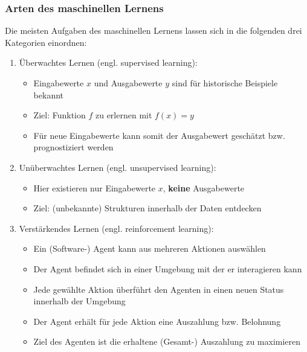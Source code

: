 \begin{frame}
\frametitle{Arten des maschinellen Lernens}
Die meisten Aufgaben des maschinellen Lernens lassen sich in die folgenden drei Kategorien einordnen:
\begin{enumerate}[<+->]
\item Überwachtes Lernen (engl. supervised learning):
	\begin{itemize}[<+->]
		\item Eingabewerte $x$ und Ausgabewerte $y$ sind für historische Beispiele bekannt
		\item Ziel: Funktion $f$ zu erlernen mit $f(x) = y$
		\item Für neue Eingabewerte kann somit der Ausgabewert geschätzt bzw. prognostiziert werden
	\end{itemize}
\item Unüberwachtes Lernen (engl. unsupervised learning):
	\begin{itemize}[<+->]
		\item Hier existieren nur Eingabewerte $x$, \textbf{keine} Ausgabewerte
		\item Ziel: (unbekannte) Strukturen innerhalb der Daten entdecken
	\end{itemize}
\item Verstärkendes Lernen (engl. reinforcement learning):
	\begin{itemize}[<+->]
		\item Ein (Software-) Agent kann aus mehreren Aktionen auswählen
		\item Der Agent befindet sich in einer Umgebung mit der er interagieren kann
		\item Jede gewählte Aktion überführt den Agenten in einen neuen Status innerhalb der Umgebung
		\item Der Agent erhält für jede Aktion eine Auszahlung bzw. Belohnung
		\item Ziel des Agenten ist die erhaltene (Gesamt-) Auszahlung zu maximieren
	\end{itemize}
\end{enumerate}
\end{frame}
